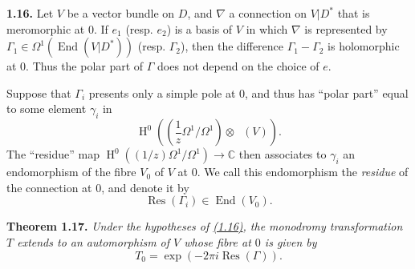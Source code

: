 \documentclass{report}
\newenvironment{itenv}[1]
  {\phantomsection\par\medskip\noindent\textbf{#1.}\itshape}
  {\medskip}
\newenvironment{rmenv}[1]
  {\phantomsection\par\medskip\noindent\textbf{#1.}\rmfamily}
  {\medskip}
\newcommand{\CC}{\mathbb{C}}
\DeclareMathOperator{\End}{End}
\DeclareMathOperator{\shEnd}{\underline{End}}
\DeclareMathOperator{\HH}{H}
\DeclareMathOperator{\Res}{Res}
\begin{document}
\begin{rmenv}{1.16}
\label{II.1.16}
  Let $V$ be a vector bundle on $D$, and $\nabla$ a connection on $V|D^*$ that is meromorphic at $0$.
  If $e_1$ (resp. $e_2$) is a basis of $V$ in which $\nabla$ is represented by $\Gamma_1\in\Omega^1(\End(V|D^*))$ (resp. $\Gamma_2$), then the difference $\Gamma_1-\Gamma_2$ is holomorphic at $0$.
  Thus the polar part of $\Gamma$ does not depend on the choice of $e$.

  Suppose that $\Gamma_i$ presents only a simple pole at $0$, and thus has ``polar part'' equal to some element $\gamma_i$ in
  \[
    \HH^0\left( \left(\frac1z\Omega^1/\Omega^1\right)\otimes\shEnd(V) \right).
  \]
  The ``residue'' map $\HH^0((1/z)\Omega^1/\Omega^1)\to\CC$ then associates to $\gamma_i$ an endomorphism of the fibre $V_0$ of $V$ at $0$.
  We call this endomorphism the \emph{residue} of the connection at $0$, and denote it by
  \[
    \Res(\Gamma_i)\in\End(V_0).
  \]
\end{rmenv}

\begin{itenv}{Theorem 1.17}
\label{II.1.17}
  Under the hypotheses of \hyperref[II.1.16]{(1.16)}, the monodromy transformation $T$ extends to an automorphism of $V$ whose fibre at $0$ is given by
  \[
    T_0 = \exp(-2\pi i\Res(\Gamma)).
  \]
\end{itenv}
\end{document}
